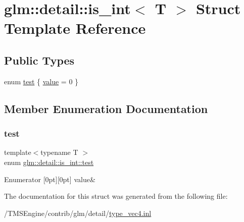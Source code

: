 \hypertarget{structglm_1_1detail_1_1is__int}{}\section{glm\+:\+:detail\+:\+:is\+\_\+int$<$ T $>$ Struct Template Reference}
\label{structglm_1_1detail_1_1is__int}
\subsection*{Public Types}
\begin{DoxyCompactItemize}
\item 
enum \hyperlink{structglm_1_1detail_1_1is__int_a6a1d15bd1184bc07664114fa30199e01}{test} \{ \hyperlink{structglm_1_1detail_1_1is__int_a6a1d15bd1184bc07664114fa30199e01a788143fb0374c29be9a2f50e5c493c1b}{value} = 0
 \}
\end{DoxyCompactItemize}


\subsection{Member Enumeration Documentation}
\mbox{\label{structglm_1_1detail_1_1is__int_a6a1d15bd1184bc07664114fa30199e01}} 
\subsubsection{\texorpdfstring{test}{test}}
{\footnotesize\ttfamily template$<$typename T $>$ \\
enum \hyperlink{structglm_1_1detail_1_1is__int_a6a1d15bd1184bc07664114fa30199e01}{glm\+::detail\+::is\+\_\+int\+::test}}

\begin{DoxyEnumFields}{Enumerator}
[0pt][0pt]{}\mbox{\label{structglm_1_1detail_1_1is__int_a6a1d15bd1184bc07664114fa30199e01a788143fb0374c29be9a2f50e5c493c1b}} 
value&\\
\hline

\end{DoxyEnumFields}


The documentation for this struct was generated from the following file\+:\begin{DoxyCompactItemize}
\item 
/\+T\+M\+S\+Engine/contrib/glm/detail/\hyperlink{type__vec4_8inl}{type\+\_\+vec4.\+inl}\end{DoxyCompactItemize}
